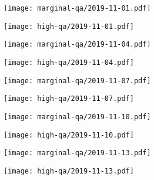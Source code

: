 \documentclass{article}
\begin{document}
\begin{figure}[H]
	\ContinuedFloat
	\centering
	\begin{subfigure}{0.48\linewidth}
		\texttt{[image: marginal-qa/2019-11-01.pdf]}
	\end{subfigure}
	\begin{subfigure}{0.48\linewidth}
		\texttt{[image: high-qa/2019-11-01.pdf]}
	\end{subfigure}
	\begin{subfigure}{0.48\linewidth}
		\texttt{[image: marginal-qa/2019-11-04.pdf]}
	\end{subfigure}
	\begin{subfigure}{0.48\linewidth}
		\texttt{[image: high-qa/2019-11-04.pdf]}
	\end{subfigure}
	\begin{subfigure}{0.48\linewidth}
		\texttt{[image: marginal-qa/2019-11-07.pdf]}
	\end{subfigure}
	\begin{subfigure}{0.48\linewidth}
		\texttt{[image: high-qa/2019-11-07.pdf]}
	\end{subfigure}
	\begin{subfigure}{0.48\linewidth}
		\texttt{[image: marginal-qa/2019-11-10.pdf]}
	\end{subfigure}
	\begin{subfigure}{0.48\linewidth}
		\texttt{[image: high-qa/2019-11-10.pdf]}
	\end{subfigure}
	\begin{subfigure}{0.48\linewidth}
		\texttt{[image: marginal-qa/2019-11-13.pdf]}
	\end{subfigure}
	\begin{subfigure}{0.48\linewidth}
		\texttt{[image: high-qa/2019-11-13.pdf]}
	\end{subfigure}
\end{figure}
\end{document}
